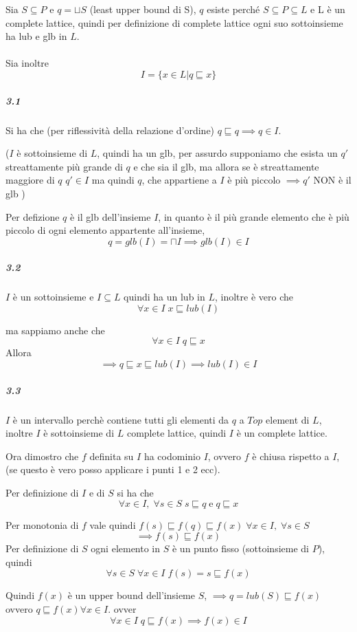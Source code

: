 \documentclass{article}
\begin{document}
Sia $ S \subseteq P$ e $ q = \sqcup S$ (least upper bound di S), $q$ esiste perché $S \subseteq P \subseteq L$ e L è un complete lattice, quindi per definizione di complete lattice ogni suo sottoinsieme ha lub e glb in $L$.\\\\
Sia inoltre $$I=\{x \in L | q \sqsubseteq x\}$$

\subparagraph{3.1}Si ha che (per riflessività della relazione d'ordine) $q \sqsubseteq q \implies q \in I$.

($I$ è sottoinsieme di $L$, quindi ha un glb, per assurdo supponiamo che esista un $q'$ streattamente più grande di $q$ e che sia il glb, ma allora se è streattamente maggiore di $q$ $q'\in I$ ma quindi $q$, che appartiene a $I$ è più piccolo $\implies q'$ NON è il glb  )

Per defizione $q$ è il glb dell'insieme $I$, in quanto è il più grande elemento che è più piccolo di ogni elemento appartente all'insieme, $$q=glb(I)= \sqcap I \implies glb(I) \in I$$

\subparagraph{3.2}

$I$ è un sottoinsieme e $I\subseteq L$ quindi ha un lub in $L$, inoltre è vero che $$\forall x \in I \; x \sqsubseteq lub(I)$$ 

ma sappiamo anche che $$\forall x \in I \; q \sqsubseteq x$$ 
Allora
$$\implies q \sqsubseteq x \sqsubseteq lub(I) \implies lub(I) \in I$$

\subparagraph{3.3}

$I$ è un intervallo perchè contiene tutti gli elementi da $q$ a $Top $ element  di $L$, inoltre $I$ è sottoinsieme di $L$ complete lattice, quindi $I$ è un complete lattice.

Ora dimostro che $f$ definita su $I$ ha codominio $I$, ovvero $f$ è chiusa rispetto a $I$, (se questo è vero posso applicare i punti 1 e 2 ecc). 

Per definizione di $I$ e di $S$ si ha che $$ \forall x \in I, \; \forall s \in S \; s \sqsubseteq q\; \text{e}\; q \sqsubseteq x  $$

Per monotonia di $f$ vale quindi $f(s)\sqsubseteq f(q)\sqsubseteq f(x)\; \forall x \in I, \; \forall s \in S  $
$$\implies f(s) \sqsubseteq f(x)$$
Per definizione di $S$ ogni elemento in $S$ è un punto fisso (sottoinsieme di $P$), quindi $$\forall s \in S \; \forall x \in I \; f(s)=s\sqsubseteq f(x)$$

Quindi $f(x)$ è un upper bound dell'insieme $S$, $\implies q=lub(S) \sqsubseteq f(x) $ ovvero $q\sqsubseteq f(x) \forall x \in I$. ovver $$ \forall x \in I \; q \sqsubseteq f(x) \implies f(x) \in I$$
\end{document}
